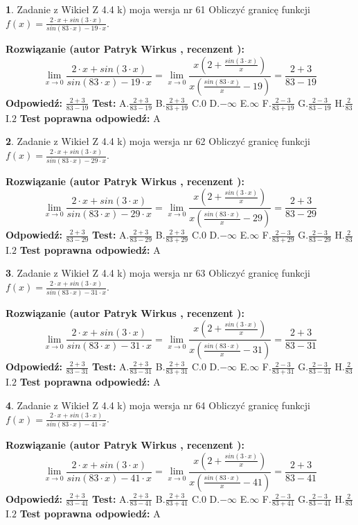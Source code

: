 \documentclass[12pt, a4paper]{article}
\theoremstyle{definition} %
\newtheorem{zad}{}
\newcommand{\zadStart}[1]{\begin{zad}#1\newline}
\newcommand{\zadStop}{\end{zad}}
\newcommand{\rozwStart}[2]{\noindent \textbf{Rozwiązanie (autor #1 , recenzent #2): }\newline}
\newcommand{\rozwStop}{\newline}
\newcommand{\odpStart}{\noindent \textbf{Odpowiedź:}\newline}
\newcommand{\odpStop}{\newline}
\newcommand{\testStart}{\noindent \textbf{Test:}\newline}
\newcommand{\testStop}{\newline}
\newcommand{\kluczStart}{\noindent \textbf{Test poprawna odpowiedź:}\newline}
\newcommand{\kluczStop}{\newline}
\begin{document}
\zadStart{Zadanie z Wikieł Z 4.4 k) moja wersja nr 61}
Obliczyć granicę funkcji $f(x)=\frac{2\cdot x +sin(3\cdot x)}{sin(83\cdot x) -19\cdot x}$.
\zadStop
\rozwStart{Patryk Wirkus}{}
$$\lim\limits_{x\to 0}\frac{2\cdot x +sin(3\cdot x)}{sin(83\cdot x) -19\cdot x}
=\lim\limits_{x\to 0}\frac{x(2+\frac{sin(3\cdot x)}{x})}{x(\frac{sin(83\cdot x)}{x}-19)}
=\frac{2+3}{83-19}$$
\rozwStop
\odpStart
$\frac{2+3}{83-19}$
\odpStop
\testStart
A.$\frac{2+3}{83-19}$
B.$\frac{2+3}{83+19}$
C.$0$
D.$-\infty$
E.$\infty$
F.$\frac{2-3}{83+19}$
G.$\frac{2-3}{83-19}$
H.$\frac{2}{83}$
I.$2$
\testStop
\kluczStart
A
\kluczStop



\zadStart{Zadanie z Wikieł Z 4.4 k) moja wersja nr 62}
Obliczyć granicę funkcji $f(x)=\frac{2\cdot x +sin(3\cdot x)}{sin(83\cdot x) -29\cdot x}$.
\zadStop
\rozwStart{Patryk Wirkus}{}
$$\lim\limits_{x\to 0}\frac{2\cdot x +sin(3\cdot x)}{sin(83\cdot x) -29\cdot x}
=\lim\limits_{x\to 0}\frac{x(2+\frac{sin(3\cdot x)}{x})}{x(\frac{sin(83\cdot x)}{x}-29)}
=\frac{2+3}{83-29}$$
\rozwStop
\odpStart
$\frac{2+3}{83-29}$
\odpStop
\testStart
A.$\frac{2+3}{83-29}$
B.$\frac{2+3}{83+29}$
C.$0$
D.$-\infty$
E.$\infty$
F.$\frac{2-3}{83+29}$
G.$\frac{2-3}{83-29}$
H.$\frac{2}{83}$
I.$2$
\testStop
\kluczStart
A
\kluczStop



\zadStart{Zadanie z Wikieł Z 4.4 k) moja wersja nr 63}
Obliczyć granicę funkcji $f(x)=\frac{2\cdot x +sin(3\cdot x)}{sin(83\cdot x) -31\cdot x}$.
\zadStop
\rozwStart{Patryk Wirkus}{}
$$\lim\limits_{x\to 0}\frac{2\cdot x +sin(3\cdot x)}{sin(83\cdot x) -31\cdot x}
=\lim\limits_{x\to 0}\frac{x(2+\frac{sin(3\cdot x)}{x})}{x(\frac{sin(83\cdot x)}{x}-31)}
=\frac{2+3}{83-31}$$
\rozwStop
\odpStart
$\frac{2+3}{83-31}$
\odpStop
\testStart
A.$\frac{2+3}{83-31}$
B.$\frac{2+3}{83+31}$
C.$0$
D.$-\infty$
E.$\infty$
F.$\frac{2-3}{83+31}$
G.$\frac{2-3}{83-31}$
H.$\frac{2}{83}$
I.$2$
\testStop
\kluczStart
A
\kluczStop



\zadStart{Zadanie z Wikieł Z 4.4 k) moja wersja nr 64}
Obliczyć granicę funkcji $f(x)=\frac{2\cdot x +sin(3\cdot x)}{sin(83\cdot x) -41\cdot x}$.
\zadStop
\rozwStart{Patryk Wirkus}{}
$$\lim\limits_{x\to 0}\frac{2\cdot x +sin(3\cdot x)}{sin(83\cdot x) -41\cdot x}
=\lim\limits_{x\to 0}\frac{x(2+\frac{sin(3\cdot x)}{x})}{x(\frac{sin(83\cdot x)}{x}-41)}
=\frac{2+3}{83-41}$$
\rozwStop
\odpStart
$\frac{2+3}{83-41}$
\odpStop
\testStart
A.$\frac{2+3}{83-41}$
B.$\frac{2+3}{83+41}$
C.$0$
D.$-\infty$
E.$\infty$
F.$\frac{2-3}{83+41}$
G.$\frac{2-3}{83-41}$
H.$\frac{2}{83}$
I.$2$
\testStop
\kluczStart
A
\kluczStop
\end{document}
